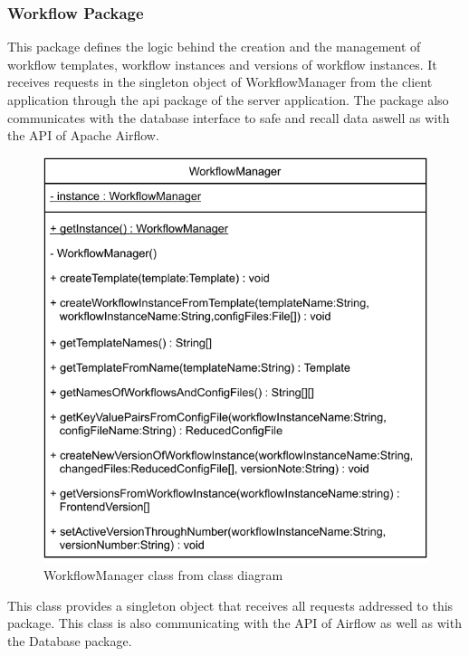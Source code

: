 \subsubsection{Workflow Package}
This package defines the logic behind the creation and the management of workflow templates, workflow instances and versions of workflow instances. It receives requests in the singleton object of WorkflowManager from the client application through the api package of the server application. The package also communicates with the database interface to safe and recall data aswell as with the API of Apache Airflow.


\begin{figure}[h]
\centerline{\includegraphics[scale=1]{res/Klassen/WorkflowManager.pdf}}
\caption{WorkflowManager class from class diagram}
\end{figure}

This class provides a singleton object that receives all requests addressed to this package. This class is also communicating with the API of Airflow as well as with the Database package.

